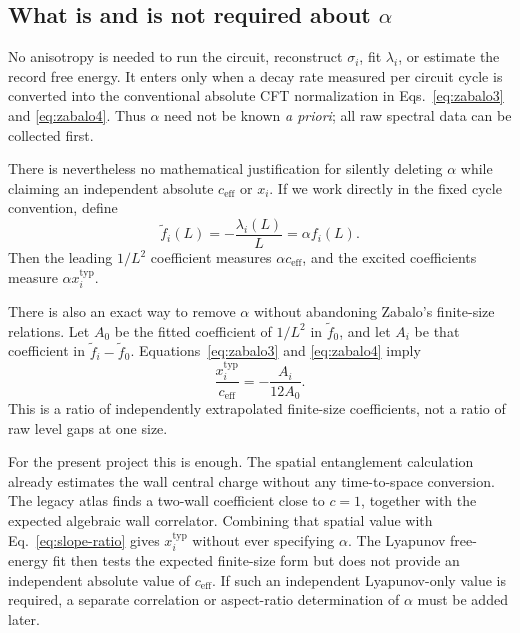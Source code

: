 \documentclass[aps,prb,twocolumn,floatfix,nofootinbib,superscriptaddress]{revtex4-2}
\begin{document}
\subsection{What is and is not required about \texorpdfstring{\(\alpha\)}{alpha}}

No anisotropy is needed to run the circuit, reconstruct \(\sigma_i\), fit \(\lambda_i\), or estimate the record free energy.  It enters only when a decay rate measured per circuit cycle is converted into the conventional absolute CFT normalization in Eqs.~\eqref{eq:zabalo3} and \eqref{eq:zabalo4}.  Thus \(\alpha\) need not be known \emph{a priori}; all raw spectral data can be collected first.

There is nevertheless no mathematical justification for silently deleting \(\alpha\) while claiming an independent absolute \(c_{\mathrm{eff}}\) or \(x_i\).  If we work directly in the fixed cycle convention, define
\begin{equation}
 \widetilde f_i(L)=-\frac{\lambda_i(L)}{L}=\alpha f_i(L).
 \label{eq:raw-fi}
\end{equation}
Then the leading \(1/L^2\) coefficient measures \(\alpha c_{\mathrm{eff}}\), and the excited coefficients measure \(\alpha x_i^{\mathrm{typ}}\).

There is also an exact way to remove \(\alpha\) without abandoning Zabalo's finite-size relations.  Let \(A_0\) be the fitted coefficient of \(1/L^2\) in \(\widetilde f_0\), and let \(A_i\) be that coefficient in \(\widetilde f_i-\widetilde f_0\).  Equations~\eqref{eq:zabalo3} and \eqref{eq:zabalo4} imply
\begin{equation}
 \frac{x_i^{\mathrm{typ}}}{c_{\mathrm{eff}}}
 =-\frac{A_i}{12A_0}.
 \label{eq:slope-ratio}
\end{equation}
This is a ratio of independently extrapolated finite-size coefficients, not a ratio of raw level gaps at one size.

For the present project this is enough.  The spatial entanglement calculation already estimates the wall central charge without any time-to-space conversion.  The legacy atlas finds a two-wall coefficient close to \(c=1\), together with the expected algebraic wall correlator.  Combining that spatial value with Eq.~\eqref{eq:slope-ratio} gives \(x_i^{\mathrm{typ}}\) without ever specifying \(\alpha\).  The Lyapunov free-energy fit then tests the expected finite-size form but does not provide an independent absolute value of \(c_{\mathrm{eff}}\).  If such an independent Lyapunov-only value is required, a separate correlation or aspect-ratio determination of \(\alpha\) must be added later.
\end{document}
